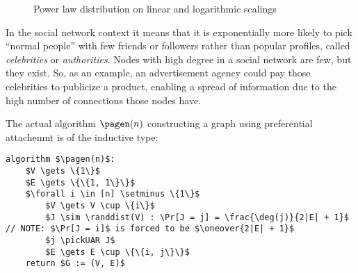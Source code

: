 \begin{figure}[ht]
    \centering
    \textwidth
    \caption{Power law distribution on linear and logarithmic scalings}
    \label{fig:power-law}
\end{figure}

In the social network context it means that it is exponentially more likely to pick ``normal people'' with few friends or followers rather than popular profiles, called \emph{celebrities} or \emph{authorities}. Nodes with high degree in a social network are few, but they exist. So, as an example, an advertisement agency could pay those celebrities to publicize a product, enabling a spread of information due to the high number of connections those nodes have.

The actual algorithm $\pagen(n)$ constructing a graph using preferential attachemnt is of the inductive type:

\begin{lstlisting}[caption = {The $\pagen(n)$ algorithm}, label = {lst:algopa}]
algorithm $\pagen(n)$:
    $V \gets \{1\}$
    $E \gets \{\{1, 1\}\}$
    $\forall i \in [n] \setminus \{1\}$
        $V \gets V \cup \{i\}$
        $J \sim \randdist(V) : \Pr[J = j] = \frac{\deg(j)}{2|E| + 1}$ // NOTE: $\Pr[J = i]$ is forced to be $\oneover{2|E| + 1}$
        $j \pickUAR J$
        $E \gets E \cup \{\{i, j\}\}$
    return $G := (V, E)$
\end{lstlisting}


